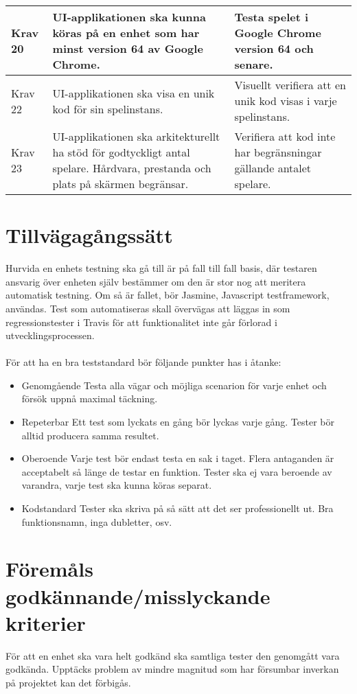 \documentclass[10pt]{article}
\begin{document}
\begin{tabular}{| p{1.5cm} | p{8cm} | p{8cm}|}
		\hline
		Krav 20& UI-applikationen ska kunna köras på en enhet som har minst version 64 av Google Chrome. &Testa spelet i Google Chrome version 64 och senare. \\
		\hline
		Krav 22& UI-applikationen ska visa en unik kod för sin spelinstans. &Visuellt verifiera att en unik kod visas i varje spelinstans.\\
		\hline
		Krav 23& UI-applikationen ska arkitekturellt ha stöd för godtyckligt antal spelare. Hårdvara, prestanda och plats på skärmen begränsar. &Verifiera att kod inte har begränsningar gällande antalet spelare. \\
		\hline


   
  \end{tabular}
	


\section{Tillvägagångssätt}
	Hurvida en enhets testning ska gå till är på fall till fall basis, där testaren ansvarig över enheten själv bestämmer om den är stor nog att meritera automatisk testning.
	Om så är fallet, bör {\color{red}Jasmine}, Javascript testframework, användas. Test som automatiseras skall övervägas att läggas in som regressionstester i Travis för att funktionalitet inte går förlorad i utvecklingsprocessen. \\
	\\
	För att ha en bra teststandard bör följande punkter has i åtanke:
	\begin {itemize}
	 \item [Genomgående] Testa alla vägar och möjliga scenarion för varje enhet och försök uppnå maximal täckning.
	 \item [Repeterbar] Ett test som lyckats en gång bör lyckas varje gång. Tester bör alltid producera samma resultet.
	 \item [Oberoende] Varje test bör endast testa en sak i taget. Flera antaganden är acceptabelt så länge de testar en funktion. Tester ska ej vara beroende av varandra, varje test ska kunna köras separat.
	 \item [Kodstandard] Tester ska skriva på så sätt att det ser professionellt ut. Bra funktionsnamn, inga dubletter, osv.
	\end {itemize}

	

\section{Föremåls godkännande/misslyckande kriterier}
	För att en enhet ska vara helt godkänd ska samtliga tester den genomgått vara godkända. Upptäcks problem av mindre magnitud som har försumbar inverkan på projektet kan det förbigås.
\end{document}
